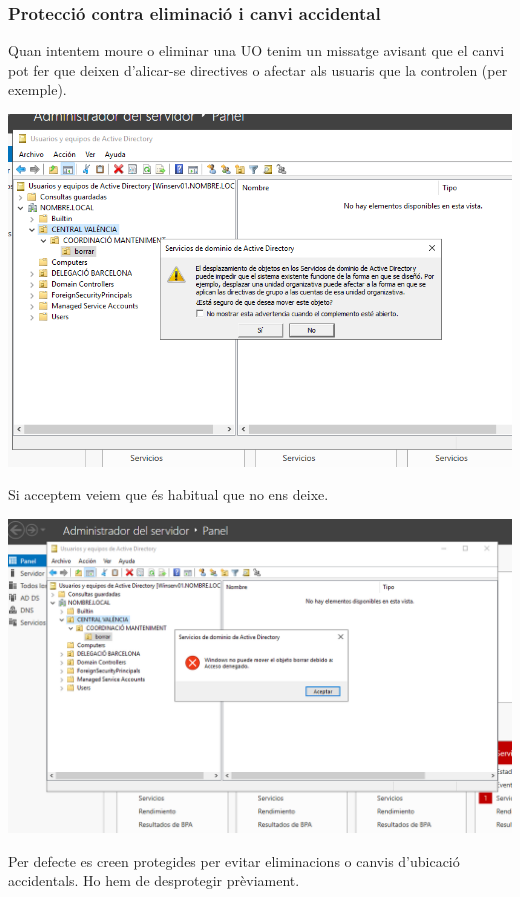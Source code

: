 \documentclass[
  a4paper,
]{article}
\begin{document}
\subsubsection{Protecció contra eliminació i canvi
accidental}\label{protecciuxf3-contra-eliminaciuxf3-i-canvi-accidental}

Quan intentem moure o eliminar una UO tenim un missatge avisant que el
canvi pot fer que deixen d'alicar-se directives o afectar als usuaris
que la controlen (per exemple).

\includegraphics{png/uoMoverAviso.png}

Si acceptem veiem que és habitual que no ens deixe.

\includegraphics{png/uoMoverNOPermiso.png}

Per defecte es creen protegides per evitar eliminacions o canvis
d'ubicació accidentals. Ho hem de desprotegir prèviament.
\end{document}
